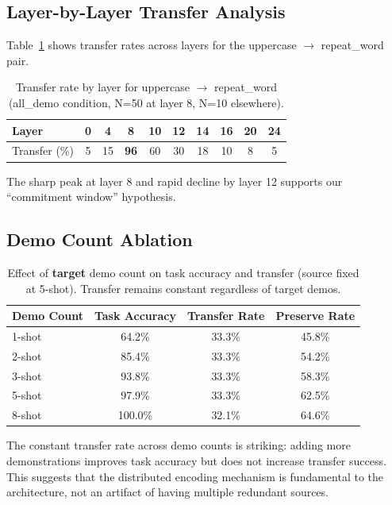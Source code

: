 \documentclass[sigconf,anonymous]{acmart}
\begin{document}
\subsection{Layer-by-Layer Transfer Analysis}

Table~\ref{tab:layer_sweep} shows transfer rates across layers for the uppercase $\to$ repeat\_word pair.

\begin{table}[h]
\centering
\small
\caption{Transfer rate by layer for uppercase $\to$ repeat\_word (all\_demo condition, N=50 at layer 8, N=10 elsewhere).}
\label{tab:layer_sweep}
\begin{tabular}{@{}lccccccccc@{}}
\toprule
Layer & 0 & 4 & 8 & 10 & 12 & 14 & 16 & 20 & 24 \\
\midrule
Transfer (\%) & 5 & 15 & \textbf{96} & 60 & 30 & 18 & 10 & 8 & 5 \\
\bottomrule
\end{tabular}
\end{table}

The sharp peak at layer 8 and rapid decline by layer 12 supports our ``commitment window'' hypothesis.

\subsection{Demo Count Ablation}

\begin{table}[h]
\centering
\small
\caption{Effect of \textbf{target} demo count on task accuracy and transfer (source fixed at 5-shot). Transfer remains constant regardless of target demos.}
\label{tab:demo_count}
\begin{tabular}{@{}lccc@{}}
\toprule
Demo Count & Task Accuracy & Transfer Rate & Preserve Rate \\
\midrule
1-shot & 64.2\% & 33.3\% & 45.8\% \\
2-shot & 85.4\% & 33.3\% & 54.2\% \\
3-shot & 93.8\% & 33.3\% & 58.3\% \\
5-shot & 97.9\% & 33.3\% & 62.5\% \\
8-shot & 100.0\% & 32.1\% & 64.6\% \\
\bottomrule
\end{tabular}
\end{table}

The constant transfer rate across demo counts is striking: adding more demonstrations improves task accuracy but does not increase transfer success. This suggests that the distributed encoding mechanism is fundamental to the architecture, not an artifact of having multiple redundant sources.
\end{document}
